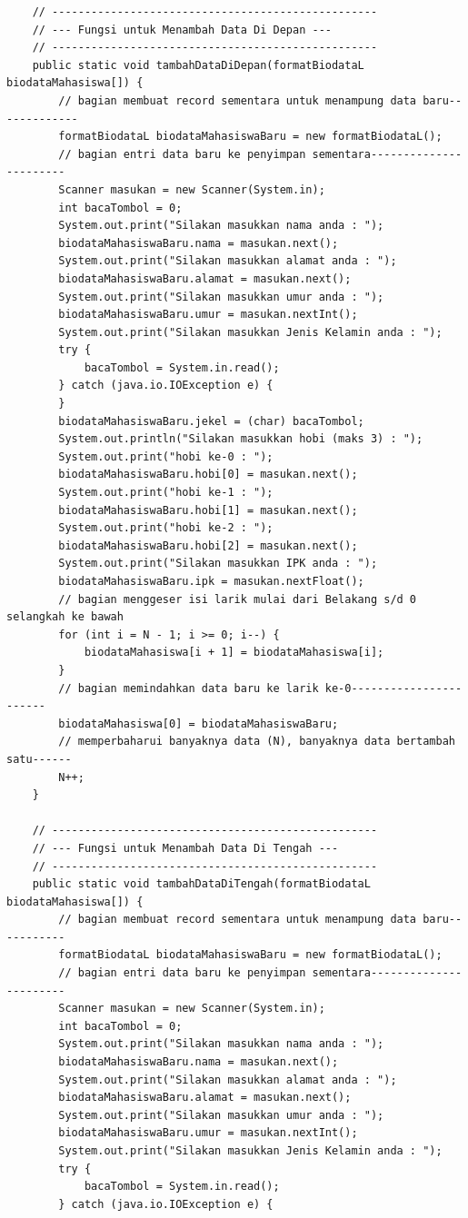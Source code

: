 \documentclass[a4paper,12pt]{article}
\begin{document}
\begin{lstlisting}
    // --------------------------------------------------
    // --- Fungsi untuk Menambah Data Di Depan ---
    // --------------------------------------------------
    public static void tambahDataDiDepan(formatBiodataL biodataMahasiswa[]) {
        // bagian membuat record sementara untuk menampung data baru-------------
        formatBiodataL biodataMahasiswaBaru = new formatBiodataL();
        // bagian entri data baru ke penyimpan sementara-----------------------
        Scanner masukan = new Scanner(System.in);
        int bacaTombol = 0;
        System.out.print("Silakan masukkan nama anda : ");
        biodataMahasiswaBaru.nama = masukan.next();
        System.out.print("Silakan masukkan alamat anda : ");
        biodataMahasiswaBaru.alamat = masukan.next();
        System.out.print("Silakan masukkan umur anda : ");
        biodataMahasiswaBaru.umur = masukan.nextInt();
        System.out.print("Silakan masukkan Jenis Kelamin anda : ");
        try {
            bacaTombol = System.in.read();
        } catch (java.io.IOException e) {
        }
        biodataMahasiswaBaru.jekel = (char) bacaTombol;
        System.out.println("Silakan masukkan hobi (maks 3) : ");
        System.out.print("hobi ke-0 : ");
        biodataMahasiswaBaru.hobi[0] = masukan.next();
        System.out.print("hobi ke-1 : ");
        biodataMahasiswaBaru.hobi[1] = masukan.next();
        System.out.print("hobi ke-2 : ");
        biodataMahasiswaBaru.hobi[2] = masukan.next();
        System.out.print("Silakan masukkan IPK anda : ");
        biodataMahasiswaBaru.ipk = masukan.nextFloat();
        // bagian menggeser isi larik mulai dari Belakang s/d 0 selangkah ke bawah
        for (int i = N - 1; i >= 0; i--) {
            biodataMahasiswa[i + 1] = biodataMahasiswa[i];
        }
        // bagian memindahkan data baru ke larik ke-0-----------------------
        biodataMahasiswa[0] = biodataMahasiswaBaru;
        // memperbaharui banyaknya data (N), banyaknya data bertambah satu------
        N++;
    }

    // --------------------------------------------------
    // --- Fungsi untuk Menambah Data Di Tengah ---
    // --------------------------------------------------
    public static void tambahDataDiTengah(formatBiodataL biodataMahasiswa[]) {
        // bagian membuat record sementara untuk menampung data baru-----------
        formatBiodataL biodataMahasiswaBaru = new formatBiodataL();
        // bagian entri data baru ke penyimpan sementara-----------------------
        Scanner masukan = new Scanner(System.in);
        int bacaTombol = 0;
        System.out.print("Silakan masukkan nama anda : ");
        biodataMahasiswaBaru.nama = masukan.next();
        System.out.print("Silakan masukkan alamat anda : ");
        biodataMahasiswaBaru.alamat = masukan.next();
        System.out.print("Silakan masukkan umur anda : ");
        biodataMahasiswaBaru.umur = masukan.nextInt();
        System.out.print("Silakan masukkan Jenis Kelamin anda : ");
        try {
            bacaTombol = System.in.read();
        } catch (java.io.IOException e) {


\end{lstlisting}
\end{document}
